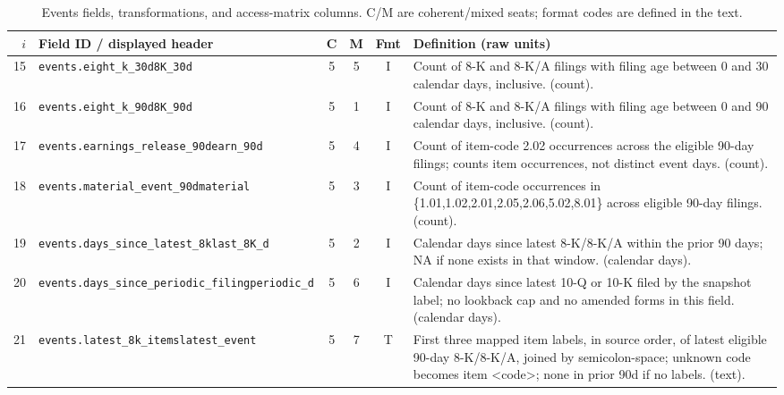 \begin{table}[t]
\caption{Events fields, transformations, and access-matrix columns. C/M are coherent/mixed seats; format codes are defined in the text.}
\label{tab:repro-events}
\small
\begin{tabular}{@{}rp{}cccp{}@{}}
\toprule
$i$ & Field ID / displayed header & C & M & Fmt & Definition (raw units) \\
\midrule
15 & \texttt{events.\allowbreak{}eight\_\allowbreak{}k\_\allowbreak{}30d}\newline \texttt{8K\_\allowbreak{}30d} & 5 & 5 & I & Count of 8-K and 8-K/A filings with filing age between 0 and 30 calendar days, inclusive. (count). \\[2pt]
16 & \texttt{events.\allowbreak{}eight\_\allowbreak{}k\_\allowbreak{}90d}\newline \texttt{8K\_\allowbreak{}90d} & 5 & 1 & I & Count of 8-K and 8-K/A filings with filing age between 0 and 90 calendar days, inclusive. (count). \\[2pt]
17 & \texttt{events.\allowbreak{}earnings\_\allowbreak{}release\_\allowbreak{}90d}\newline \texttt{earn\_\allowbreak{}90d} & 5 & 4 & I & Count of item-code 2.02 occurrences across the eligible 90-day filings; counts item occurrences, not distinct event days. (count). \\[2pt]
18 & \texttt{events.\allowbreak{}material\_\allowbreak{}event\_\allowbreak{}90d}\newline \texttt{material} & 5 & 3 & I & Count of item-code occurrences in \{1.01,1.02,2.01,2.05,2.06,5.02,8.01\} across eligible 90-day filings. (count). \\[2pt]
19 & \texttt{events.\allowbreak{}days\_\allowbreak{}since\_\allowbreak{}latest\_\allowbreak{}8k}\newline \texttt{last\_\allowbreak{}8K\_\allowbreak{}d} & 5 & 2 & I & Calendar days since latest 8-K/8-K/A within the prior 90 days; NA if none exists in that window. (calendar days). \\[2pt]
20 & \texttt{events.\allowbreak{}days\_\allowbreak{}since\_\allowbreak{}periodic\_\allowbreak{}filing}\newline \texttt{periodic\_\allowbreak{}d} & 5 & 6 & I & Calendar days since latest 10-Q or 10-K filed by the snapshot label; no lookback cap and no amended forms in this field. (calendar days). \\[2pt]
21 & \texttt{events.\allowbreak{}latest\_\allowbreak{}8k\_\allowbreak{}items}\newline \texttt{latest\_\allowbreak{}event} & 5 & 7 & T & First three mapped item labels, in source order, of latest eligible 90-day 8-K/8-K/A, joined by semicolon-space; unknown code becomes item <code>; none in prior 90d if no labels. (text). \\[2pt]
\bottomrule
\end{tabular}
\end{table}

